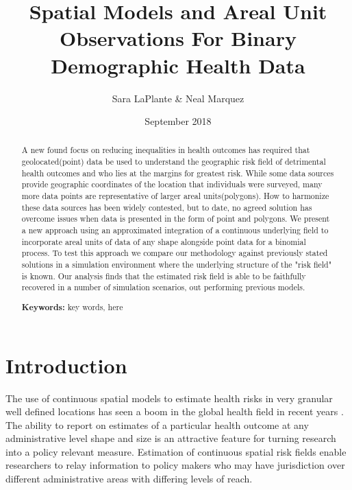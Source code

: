 \documentclass{article}
\begin{document}
\title{Spatial Models and Areal Unit Observations For Binary Demographic Health Data}
\author{Sara LaPlante \& Neal Marquez}
\date{September 2018}

\maketitle

\begin{abstract}
A new found focus on reducing inequalities in health outcomes has required that geolocated(point) data be used to understand the geographic risk field of detrimental health outcomes and who lies at the margins for greatest risk. While some data sources provide geographic coordinates of the location that individuals were surveyed, many more data points are representative of larger areal units(polygons). How to harmonize these data sources has been widely contested, but to date, no agreed solution has overcome issues when data is presented in the form of point and polygons. We present a new approach using an approximated integration of a continuous underlying field to incorporate areal units of data of any shape alongside point data for a binomial process.  To test this approach we compare our methodology against previously stated solutions in a simulation environment where the underlying structure of the "risk field" is known. Our analysis finds that the estimated risk field is able to be faithfully recovered in a number of simulation scenarios, out performing previous models. 
\par \textbf{Keywords:} key words, here
\end{abstract}

\section{Introduction}\label{introduction}

The use of continuous spatial models to estimate health risks in very granular well defined locations has seen a boom in the global health field in recent years \cite{Bosco2017, Burke2016, Gething2015, Golding2017, Utazi2018a, Wakefield2017}. The ability to report on estimates of a particular health outcome at any administrative level shape and size is an attractive feature for turning research into a policy relevant measure. Estimation of continuous spatial risk fields enable researchers to relay information to policy makers who may have jurisdiction over different administrative areas with differing levels of reach. 
\end{document}
